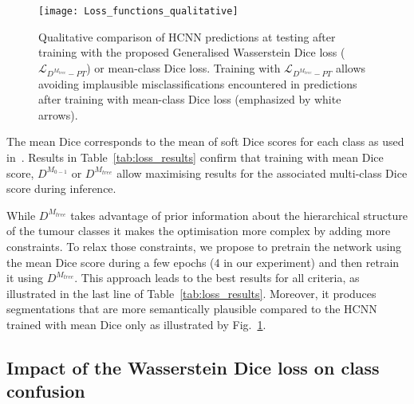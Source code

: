 \documentclass[runningheads,orivec,a4paper]{llncs}
\begin{document}
\begin{figure}[t!]
	\centering
	\texttt{[image: Loss\_functions\_qualitative]}
	\caption{Qualitative comparison of HCNN predictions at testing after training with the proposed Generalised Wasserstein Dice loss ($\mathcal{L}_{D^{M_{tree}}-PT}$) or mean-class Dice loss. Training with $\mathcal{L}_{D^{M_{tree}}-PT}$ allows avoiding implausible misclassifications encountered in predictions after training with mean-class Dice loss (emphasized by white arrows).}
	\label{fig:loss_quali}
\end{figure}
%
The mean Dice corresponds to the mean of soft Dice scores for each class as used in~\cite{scalenet,highresnet}.
%
Results in Table~\ref{tab:loss_results} confirm that training with mean Dice score, $D^{M_{0-1}}$ or 
 $D^{M_{tree}}$ allow maximising results for the associated multi-class Dice score during inference.

While $D^{M_{tree}}$ takes advantage of prior information about the hierarchical structure of the tumour classes it makes the optimisation more complex by adding more constraints.
%
To relax those constraints, we propose to pretrain the network using the mean Dice score during a few epochs (4 in our experiment) and then retrain it using $D^{M_{tree}}$.
%
This approach leads to the best results for all criteria, as illustrated in the last line of Table~\ref{tab:loss_results}.
%
Moreover, it produces segmentations that are more semantically plausible compared to the HCNN trained with mean Dice only as illustrated by Fig.~\ref{fig:loss_quali}.

\subsection{Impact of the Wasserstein Dice loss on class confusion}
\end{document}
